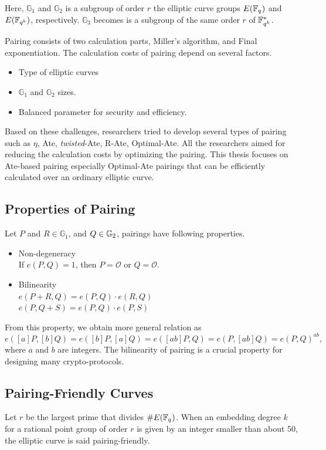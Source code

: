 Here, $\mathbb{G}_1$ and $\mathbb{G}_2$ is a subgroup of order $r$  the elliptic curve groups $E({\mathbb{F}}_{q^{}})$ and $E({\mathbb{F}}_{q^{k}})$, respectively.
$\mathbb{G}_3$ becomes is a subgroup of the same order $r$ of ${\mathbb{F}}_{q^{k}}^*$.

Pairing consists of two calculation parts, Miller's algorithm, and  Final exponentiation. 
The calculation costs of pairing depend on several factors.
\begin{itemize}
	\item Type of  elliptic curves
	\item $\mathbb{G}_1$ and $\mathbb{G}_2$ sizes.
	\item Balanced parameter for security and efficiency.
\end{itemize}

Based on these challenges, researchers tried to develop several types of pairing such as $\eta$, Ate, {\it twisted}-Ate, R-Ate, Optimal-Ate.
All the researchers aimed for reducing the calculation costs by optimizing the pairing.
This thesis focuses on Ate-based pairing especially Optimal-Ate pairings that can be efficiently calculated over an ordinary elliptic curve.

\subsection{Properties of Pairing}
Let $P$ and $R \in \mathbb{G}_1$, and $Q \in {\mathbb{G}}_{2}$, pairings have following properties.

\begin{itemize}
	\item Non-degeneracy \\
	If $e(P,Q)=1$, then $P=\mathcal{O}$ or $Q=\mathcal{O}$.\\
	\item Bilinearity\\
	$e(P+R,Q)=e(P,Q)\cdot e(R,Q)$\\
	$e(P,Q+S)=e(P,Q)\cdot e(P,S)$\\
\end{itemize}
From this property, we obtain more general relation as 
\begin{equation}
e\left([a]P,[b]Q\right)=e\left([b]P,[a]Q\right)=e\left([ab]P,Q\right)=e\left(P,[ab]Q\right)=e(P,Q)^{ab}, 
\end{equation}
where $a$ and $b$ are integers.
The bilinearity of pairing is a crucial property for designing many crypto-protocols.

\subsection{Pairing-Friendly Curves}\label{sec:pfc}
Let $r$ be the largest prime that divides $\#E({\mathbb{F}}_{q^{}})$.
When an embedding degree $k$ for a rational point group of order $r$ is given by an integer smaller than about 50, the elliptic curve is said pairing-friendly.

